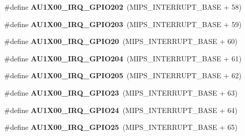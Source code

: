\begin{DoxyCompactItemize}
\mbox{\label{group__bsp__interrupt_gad80143598787412a9c77994ee40cc3e4}} 
\#define {\bfseries A\+U1\+X00\+\_\+\+I\+R\+Q\+\_\+\+G\+P\+I\+O202}~(M\+I\+P\+S\+\_\+\+I\+N\+T\+E\+R\+R\+U\+P\+T\+\_\+\+B\+A\+SE + 58)
\item 
\mbox{\label{group__bsp__interrupt_gaa74882b05a2c91dcfcec272d45c40c1d}} 
\#define {\bfseries A\+U1\+X00\+\_\+\+I\+R\+Q\+\_\+\+G\+P\+I\+O203}~(M\+I\+P\+S\+\_\+\+I\+N\+T\+E\+R\+R\+U\+P\+T\+\_\+\+B\+A\+SE + 59)
\item 
\mbox{\label{group__bsp__interrupt_ga3b311e5cd3588adcdf57fc5ed4b2bb75}} 
\#define {\bfseries A\+U1\+X00\+\_\+\+I\+R\+Q\+\_\+\+G\+P\+I\+O20}~(M\+I\+P\+S\+\_\+\+I\+N\+T\+E\+R\+R\+U\+P\+T\+\_\+\+B\+A\+SE + 60)
\item 
\mbox{\label{group__bsp__interrupt_ga3ec18007375eccd1fe77be9cfecb2612}} 
\#define {\bfseries A\+U1\+X00\+\_\+\+I\+R\+Q\+\_\+\+G\+P\+I\+O204}~(M\+I\+P\+S\+\_\+\+I\+N\+T\+E\+R\+R\+U\+P\+T\+\_\+\+B\+A\+SE + 61)
\item 
\mbox{\label{group__bsp__interrupt_ga193899330156d83976dd73930b3fefe9}} 
\#define {\bfseries A\+U1\+X00\+\_\+\+I\+R\+Q\+\_\+\+G\+P\+I\+O205}~(M\+I\+P\+S\+\_\+\+I\+N\+T\+E\+R\+R\+U\+P\+T\+\_\+\+B\+A\+SE + 62)
\item 
\mbox{\label{group__bsp__interrupt_gaee97c147dd33da3961df24b185fc601d}} 
\#define {\bfseries A\+U1\+X00\+\_\+\+I\+R\+Q\+\_\+\+G\+P\+I\+O23}~(M\+I\+P\+S\+\_\+\+I\+N\+T\+E\+R\+R\+U\+P\+T\+\_\+\+B\+A\+SE + 63)
\item 
\mbox{\label{group__bsp__interrupt_gafecea1cfd580d29bd894cbe427804517}} 
\#define {\bfseries A\+U1\+X00\+\_\+\+I\+R\+Q\+\_\+\+G\+P\+I\+O24}~(M\+I\+P\+S\+\_\+\+I\+N\+T\+E\+R\+R\+U\+P\+T\+\_\+\+B\+A\+SE + 64)
\item 
\mbox{\label{group__bsp__interrupt_ga02a16cb721d40e814ec0f9c84627defa}} 
\#define {\bfseries A\+U1\+X00\+\_\+\+I\+R\+Q\+\_\+\+G\+P\+I\+O25}~(M\+I\+P\+S\+\_\+\+I\+N\+T\+E\+R\+R\+U\+P\+T\+\_\+\+B\+A\+SE + 65)
\item 
\mbox{\label{group__bsp__interrupt_gafc9c3aabf3837b9f27c69d25c6ad2ea6}} 

\end{DoxyCompactItemize}
